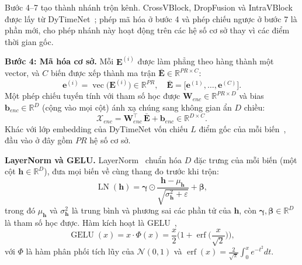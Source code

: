 \documentclass[conference]{IEEEtran}
\newcommand{\R}{\mathbb{R}}
\newcommand{\LN}{\operatorname{LN}}
\newcommand{\GELU}{\operatorname{GELU}}
\newcommand{\vecr}{\operatorname{vec}}
\begin{document}
Bước 4--7 tạo thành nhánh trộn kênh. CrossVBlock, DropFusion và IntraVBlock được lấy từ
DyTimeNet~\cite{Chen2026DyTimeNet}; phép mã hóa ở bước 4 và phép chiếu ngược ở bước 7 là phần mới, cho phép nhánh này
hoạt động trên các hệ số cơ sở thay vì các điểm thời gian gốc.

\textbf{Bước 4: Mã hóa cơ sở.} Mỗi $\mathbf{E}^{(i)}$ được làm phẳng theo hàng thành một vector, và $C$ biến được xếp
thành ma trận $\bar{\mathbf{E}}\in\R^{PR\times C}$:
\begin{equation}
\mathbf{e}^{(i)}=\vecr\big(\mathbf{E}^{(i)}\big)\in\R^{PR},\quad
\bar{\mathbf{E}}=\big[\mathbf{e}^{(1)},\dots,\mathbf{e}^{(C)}\big].
\label{eq:flatten}
\end{equation}
Một phép chiếu tuyến tính với tham số học được $\mathbf{W}_{enc}\in\R^{PR\times D}$ và bias $\mathbf{b}_{enc}\in\R^{D}$
(cộng vào mọi cột) ánh xạ chúng sang không gian ẩn $D$ chiều:
\begin{equation}
\mathcal{X}_{enc}=\mathbf{W}_{enc}^{\top}\,\bar{\mathbf{E}}+\mathbf{b}_{enc}\in\R^{D\times C}.
\label{eq:embed}
\end{equation}
Khác với lớp embedding của DyTimeNet vốn chiếu $L$ điểm gốc của mỗi biến~\cite{Chen2026DyTimeNet}, đầu vào ở đây gồm
$PR$ hệ số cơ sở.

\textbf{LayerNorm và GELU.} LayerNorm~\cite{Ba2016LayerNorm} chuẩn hóa $D$ đặc trưng của mỗi biến (một cột
$\mathbf{h}\in\R^{D}$), đưa mọi biến về cùng thang đo trước khi trộn:
\begin{equation}
\LN(\mathbf{h})=\bm{\gamma}\odot\frac{\mathbf{h}-\mu_{\mathbf{h}}}{\sqrt{\sigma^2_{\mathbf{h}}+\varepsilon}}+\bm{\beta},
\label{eq:ln-def}
\end{equation}
trong đó $\mu_{\mathbf{h}}$ và $\sigma^2_{\mathbf{h}}$ là trung bình và phương sai các phần tử của $\mathbf{h}$, còn
$\bm{\gamma},\bm{\beta}\in\R^{D}$ là tham số học được. Hàm kích hoạt là GELU~\cite{Hendrycks2016GELU},
\begin{equation}
\GELU(x)=x\cdot\Phi(x)=\frac{x}{2}\Big(1+\operatorname{erf}\Big(\frac{x}{\sqrt{2}}\Big)\Big),
\label{eq:gelu}
\end{equation}
với $\Phi$ là hàm phân phối tích lũy của $\mathcal{N}(0,1)$ và
$\operatorname{erf}(x)=\frac{2}{\sqrt{\pi}}\int_0^x e^{-t^2}dt$.
\end{document}
